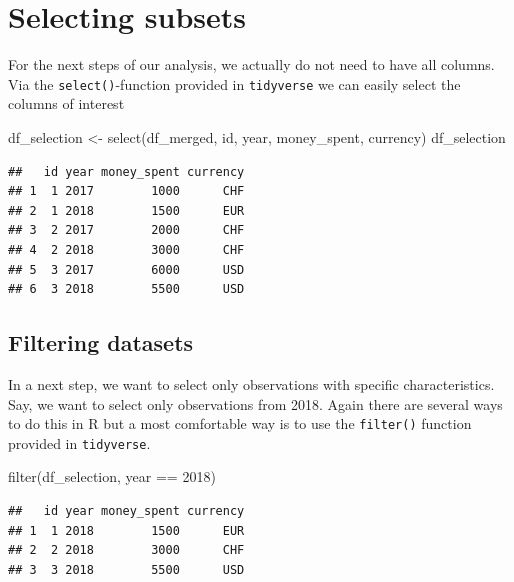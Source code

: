 \documentclass[
  12pt,
]{style/krantz}
\newenvironment{Shaded}{\begin{snugshade}}{\end{snugshade}}
\newcommand{\DecValTok}[1]{\textcolor[rgb]{0.00,0.00,0.81}{#1}}
\newcommand{\FunctionTok}[1]{\textcolor[rgb]{0.00,0.00,0.00}{#1}}
\newcommand{\NormalTok}[1]{#1}
\newcommand{\OtherTok}[1]{\textcolor[rgb]{0.56,0.35,0.01}{#1}}
\newcommand{\SpecialCharTok}[1]{\textcolor[rgb]{0.00,0.00,0.00}{#1}}
\begin{document}
\hypertarget{selecting-subsets}{%
\section{Selecting subsets}\label{selecting-subsets}}

For the next steps of our analysis, we actually do not need to have all columns. Via the \texttt{select()}-function provided in \texttt{tidyverse} we can easily select the columns of interest

\begin{Shaded}
\begin{Highlighting}[]
\NormalTok{df\_selection }\OtherTok{\textless{}{-}} \FunctionTok{select}\NormalTok{(df\_merged, id, year, money\_spent, currency)}
\NormalTok{df\_selection}
\end{Highlighting}
\end{Shaded}

\begin{verbatim}
##   id year money_spent currency
## 1  1 2017        1000      CHF
## 2  1 2018        1500      EUR
## 3  2 2017        2000      CHF
## 4  2 2018        3000      CHF
## 5  3 2017        6000      USD
## 6  3 2018        5500      USD
\end{verbatim}

\hypertarget{filtering-datasets}{%
\subsection{Filtering datasets}\label{filtering-datasets}}

In a next step, we want to select only observations with specific characteristics. Say, we want to select only observations from 2018. Again there are several ways to do this in R but a most comfortable way is to use the \texttt{filter()} function provided in \texttt{tidyverse}.

\begin{Shaded}
\begin{Highlighting}[]
\FunctionTok{filter}\NormalTok{(df\_selection, year }\SpecialCharTok{==} \DecValTok{2018}\NormalTok{)}
\end{Highlighting}
\end{Shaded}

\begin{verbatim}
##   id year money_spent currency
## 1  1 2018        1500      EUR
## 2  2 2018        3000      CHF
## 3  3 2018        5500      USD
\end{verbatim}
\end{document}
